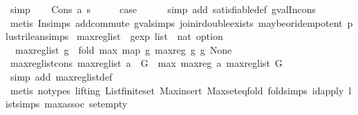 \begin{isabellebody}
\ simp\isanewline
{}\isamarkupfalse%
\isanewline
\ \ \isamarkupfalse%
\ {\isacharparenleft}Cons\ a\ s{\isacharparenright}\isanewline
\ \ \isamarkupfalse%
\ \isamarkupfalse%
\ {\isacharquery}case\isanewline
\ \ \ \ \isamarkupfalse%
\ {\isacharparenleft}simp\ add{\isacharcolon}\ satisfiable{\isacharunderscore}def\ gval{\isacharunderscore}In{\isacharunderscore}cons{\isacharparenright}\isanewline
\ \ \ \ \isamarkupfalse%
\ {\isacharparenleft}metis\ In{\isachardot}simps{\isacharparenleft}{}{\isacharparenright}\ add{\isachardot}commute\ gval{\isachardot}simps{\isacharparenleft}{}{\isacharparenright}\ join{\isacharunderscore}ir{\isacharunderscore}double{\isacharunderscore}exists\ maybe{\isacharunderscore}or{\isacharunderscore}idempotent\ plus{\isacharunderscore}trilean{\isachardot}simps{\isacharparenleft}{}{\isacharparenright}{\isacharparenright}\isanewline
{}\isamarkupfalse%
%
\endisatagproof
{\isafoldproof}%
%
\isadelimproof
\isanewline
%
\endisadelimproof
\isanewline
{}\isamarkupfalse%
\ max{\isacharunderscore}reg{\isacharunderscore}list\ {\isacharcolon}{\isacharcolon}\ {\isachardoublequoteopen}gexp\ list\ {\isasymRightarrow}\ nat\ option{\isachardoublequoteclose}\ \isanewline
\ \ {\isachardoublequoteopen}max{\isacharunderscore}reg{\isacharunderscore}list\ g\ {\isacharequal}\ {\isacharparenleft}fold\ max\ {\isacharparenleft}map\ {\isacharparenleft}{\isasymlambda}g{\isachardot}\ max{\isacharunderscore}reg\ g{\isacharparenright}\ g{\isacharparenright}\ None{\isacharparenright}{\isachardoublequoteclose}\isanewline
\isanewline
{}\isamarkupfalse%
\ max{\isacharunderscore}reg{\isacharunderscore}list{\isacharunderscore}cons{\isacharcolon}\ {\isachardoublequoteopen}max{\isacharunderscore}reg{\isacharunderscore}list\ {\isacharparenleft}a\ {\isacharhash}\ G{\isacharparenright}\ {\isacharequal}\ max\ {\isacharparenleft}max{\isacharunderscore}reg\ a{\isacharparenright}\ {\isacharparenleft}max{\isacharunderscore}reg{\isacharunderscore}list\ G{\isacharparenright}{\isachardoublequoteclose}\isanewline
%
\isadelimproof
\ \ %
\endisadelimproof
%
\isatagproof
{}\isamarkupfalse%
\ {\isacharparenleft}simp\ add{\isacharcolon}\ max{\isacharunderscore}reg{\isacharunderscore}list{\isacharunderscore}def{\isacharparenright}\isanewline
\ \ \isamarkupfalse%
\ {\isacharparenleft}metis\ {\isacharparenleft}no{\isacharunderscore}types{\isacharcomma}\ lifting{\isacharparenright}\ List{\isachardot}finite{\isacharunderscore}set\ Max{\isachardot}insert\ Max{\isachardot}set{\isacharunderscore}eq{\isacharunderscore}fold\ fold{\isachardot}simps{\isacharparenleft}{}{\isacharparenright}\ id{\isacharunderscore}apply\ list{\isachardot}simps{\isacharparenleft}{}{}{\isacharparenright}\ max{\isachardot}assoc\ set{\isacharunderscore}empty{\isacharparenright}%

\end{isabellebody}
